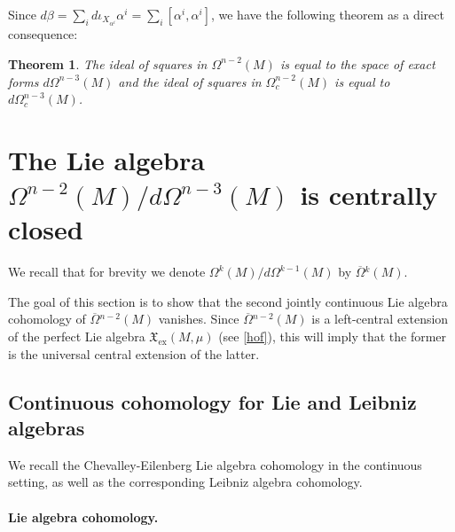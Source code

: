 \documentclass{article}
\newcommand{\ex}{\mathrm{ex}}
\newcommand{\oline}{\overline}
\newtheorem{Theorem}{Theorem}[section]
\theoremstyle{definition}
\begin{document}
Since $d\beta = \sum_{i}d \iota_{X_{\alpha^{i}}}\alpha^i = \sum_{i}[\alpha^i, \alpha^i]$, we have the following theorem as a direct consequence:
\begin{Theorem}\label{Thm:squares}
The ideal of squares in $\Omega^{n-2}(M)$ is equal to the space of exact forms $ d\Omega^{n-3}(M)$ and the ideal of squares in $\Omega^{n-2}_c(M)$ is equal to $ d\Omega^{n-3}_c(M)$.     
\end{Theorem}




\section{\texorpdfstring{The Lie algebra ${\Omega^{n-2}(M)}/{d\Omega^{n-3}(M)}$ is centrally closed}{The quotient Lie algebra is centrally closed}}\label{sec:closed}

We recall that for brevity we denote $\Omega^{k}(M)/d\Omega^{k-1}(M)$ by $\oline{\Omega}{}^{k}(M)$.


The goal of this section is to show that the second jointly continuous Lie algebra cohomology of $\oline{\Omega}{}^{n-2}(M)$ vanishes. 
Since $\oline{\Omega}{}^{n-2}(M)$ is a left-central extension of the perfect Lie algebra $\mathfrak X_{\ex}(M,\mu)$ (see \eqref{hof}), this will imply that the former is the universal central extension of the latter.


\subsection{Continuous cohomology for Lie and Leibniz algebras}\label{3.1}

We recall the Chevalley-Eilenberg Lie algebra cohomology in the continuous setting, as well as the corresponding Leibniz algebra cohomology.

\paragraph{Lie algebra cohomology.}
\end{document}
